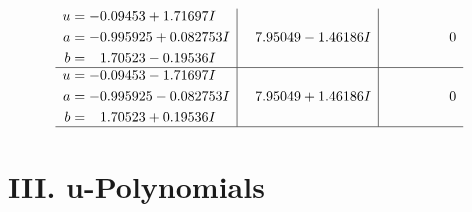 \documentclass[1p]{elsarticle_modified}
\theoremstyle{definition}
\begin{document}
$$\begin{array}{c|c|c}
\begin{aligned}
u &= -0.09453 + 1.71697 I \\
a &= -0.995925 + 0.082753 I \\
b &= \phantom{-}1.70523 - 0.19536 I\end{aligned}
 & \phantom{-}7.95049 - 1.46186 I & \phantom{-0.000000 } 0 \\ \hline\begin{aligned}
u &= -0.09453 - 1.71697 I \\
a &= -0.995925 - 0.082753 I \\
b &= \phantom{-}1.70523 + 0.19536 I\end{aligned}
 & \phantom{-}7.95049 + 1.46186 I & \phantom{-0.000000 } 0\\
 \hline 
 \end{array}$$\newpage
\newpage\renewcommand{\arraystretch}{1}
\centering \section*{ III. u-Polynomials}
\end{document}
